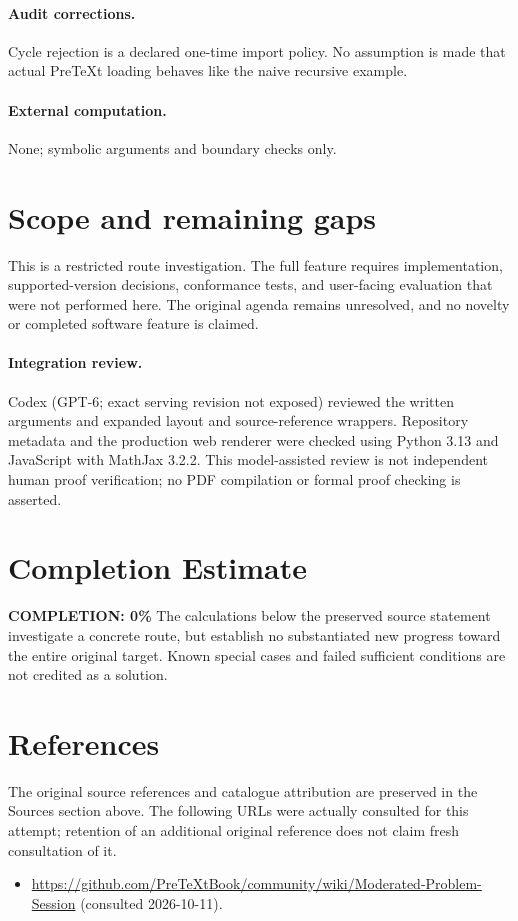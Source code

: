 \documentclass[11pt]{article}
\begin{document}
\paragraph{Audit corrections.} Cycle rejection is a declared one-time import policy. No assumption is made that actual PreTeXt loading behaves like the naive recursive example.
\paragraph{External computation.} None; symbolic arguments and boundary checks only.
\section{Scope and remaining gaps}
This is a restricted route investigation. The full feature requires implementation, supported-version decisions, conformance tests, and user-facing evaluation that were not performed here. The original agenda remains unresolved, and no novelty or completed software feature is claimed.
\paragraph{Integration review.} Codex (GPT-6; exact serving revision not exposed) reviewed the written arguments and expanded layout and source-reference wrappers. Repository metadata and the production web renderer were checked using Python 3.13 and JavaScript with MathJax 3.2.2. This model-assisted review is not independent human proof verification; no PDF compilation or formal proof checking is asserted.

\section{Completion Estimate}
\noindent\textbf{COMPLETION: 0\%}
The calculations below the preserved source statement investigate a concrete route,
but establish no substantiated new progress toward the entire original target.
Known special cases and failed sufficient conditions are not credited as a solution.
\section{References}
The original source references and catalogue attribution are preserved in the
Sources section above. The following URLs were actually consulted for this attempt;
retention of an additional original reference does not claim fresh consultation of it.
\begin{itemize}
\item \url{https://github.com/PreTeXtBook/community/wiki/Moderated-Problem-Session} (consulted 2026-10-11). 
\end{itemize}
\end{document}
